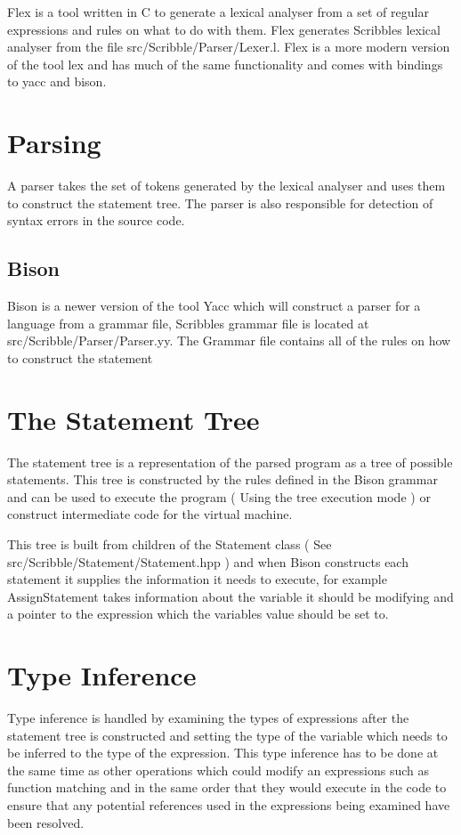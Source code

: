 \documentclass[]{final_report}
\begin{document}
Flex is a tool written in C to generate a lexical analyser from a set of regular expressions and rules on what to do with them. Flex generates Scribbles lexical analyser from the file src/Scribble/Parser/Lexer.l. Flex is a more modern version of the tool lex and has much of the same functionality and comes with bindings to yacc and bison.

\section{Parsing}

A parser takes the set of tokens generated by the lexical analyser and uses them to construct the statement tree. The parser is also responsible for detection of syntax errors in the source code.

\subsection{Bison}

Bison is a newer version of the tool Yacc which will construct a parser for a language from a grammar file, Scribbles grammar file is located at src/Scribble/Parser/Parser.yy. The Grammar file contains all of the rules on how to construct the statement 

\section{The Statement Tree}

The statement tree is a representation of the parsed program as a tree of possible statements. This tree is constructed by the rules defined in the Bison grammar and can be used to execute the program ( Using the tree execution mode ) or construct intermediate code for the virtual machine.

This tree is built from children of the Statement class ( See src/Scribble/Statement/Statement.hpp ) and when Bison constructs each statement it supplies the information it needs to execute, for example AssignStatement takes information about the variable it should be modifying and a pointer to the expression which the variables value should be set to.

\section{Type Inference}

Type inference is handled by examining the types of expressions after the statement tree is constructed and setting the type of the variable which needs to be inferred to the type of the expression. This type inference has to be done at the same time as other operations which could modify an expressions such as function matching and in the same order that they would execute in the code to ensure that any potential references used in the expressions being examined have been resolved.
\end{document}
